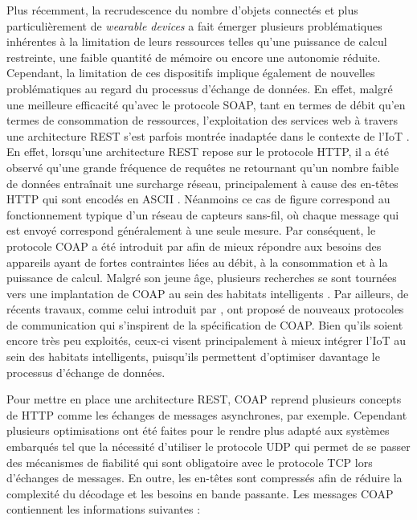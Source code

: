 Plus récemment, la recrudescence du nombre d'objets connectés et plus particulièrement de \textit{wearable devices} a fait émerger plusieurs problématiques inhérentes à la limitation de leurs ressources telles qu'une puissance de calcul restreinte, une faible quantité de mémoire ou encore une autonomie réduite. Cependant, la limitation de ces dispositifs implique également de nouvelles problématiques au regard du processus d'échange de données. En effet, malgré une meilleure efficacité qu'avec le protocole \ac{SOAP}, tant en termes de débit qu'en termes de consommation de ressources, l'exploitation des services web à travers une architecture \ac{REST} s'est parfois montrée inadaptée dans le contexte de l'\acs{IoT} \citep{Kovatsch2011}. En effet, lorsqu'une architecture \ac{REST} repose sur le protocole \ac{HTTP}, il a été observé qu'une grande fréquence de requêtes ne retournant qu'un nombre faible de données entraînait une surcharge réseau, principalement à cause des en-têtes \ac{HTTP} qui sont encodés en \ac{ASCII} \citep{Shelby2010}. Néanmoins ce cas de figure correspond au fonctionnement typique d'un réseau de capteurs sans-fil, où chaque message qui est envoyé correspond généralement à une seule mesure. Par conséquent, le protocole \ac{COAP} a été introduit par \cite{Shelby2014} afin de mieux répondre aux besoins des appareils ayant de fortes contraintes liées au débit, à la consommation et à la puissance de calcul. Malgré son jeune âge, plusieurs recherches se sont tournées vers une implantation de \ac{COAP} au sein des habitats intelligents \citep{Bergmann2012, Mainetti2015}. Par ailleurs, de récents travaux, comme celui introduit par \cite{Plantevin2017}, ont proposé de nouveaux protocoles de communication qui s'inspirent de la spécification de \ac{COAP}. Bien qu'ils soient encore très peu exploités, ceux-ci visent principalement à mieux intégrer l'\acs{IoT} au sein des habitats intelligents, puisqu'ils permettent d'optimiser davantage le processus d'échange de données.

Pour mettre en place une architecture \ac{REST}, \ac{COAP} reprend plusieurs concepts de \ac{HTTP} comme les échanges de messages asynchrones, par exemple. Cependant plusieurs optimisations ont été faites pour le rendre plus adapté aux systèmes embarqués tel que la nécessité d'utiliser le protocole \ac{UDP} qui permet de se passer des mécanismes de fiabilité qui sont obligatoire avec le protocole \acs{TCP} lors d'échanges de messages. En outre, les en-têtes sont compressés afin de réduire la complexité du décodage et les besoins en bande passante. Les messages \ac{COAP} contiennent les informations suivantes :


